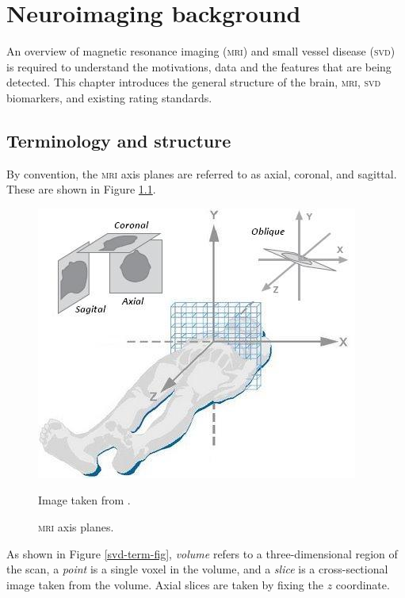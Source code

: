




\chapter{Neuroimaging background}\label{mri_svd_intro}

An overview of magnetic resonance imaging (\textsc{mri}) and small vessel disease (\textsc{svd}) is required to understand the motivations, data and the features that are being detected. This chapter introduces the general structure of the brain, \textsc{mri}, \textsc{svd} biomarkers, and existing rating standards.

\section{Terminology and structure}

By convention, the \textsc{mri} axis planes are referred to as axial, coronal, and sagittal. These are shown in Figure \ref{svd-axes}.

\begin{figure}[ht]
	\centering
	\includegraphics[scale=0.8]{Images/2_axes2.jpg}
	\caption{\textsc{mri} axis planes.}
	\small Image taken from \cite{Bean2014}.
	\label{svd-axes}
\end{figure}

As shown in Figure \ref{svd-term-fig}, \textit{volume} refers to a three-dimensional region of the scan, a \textit{point} is a single voxel in the volume, and a \textit{slice} is a cross-sectional image taken from the volume. Axial slices are taken by fixing the $z$ coordinate.

